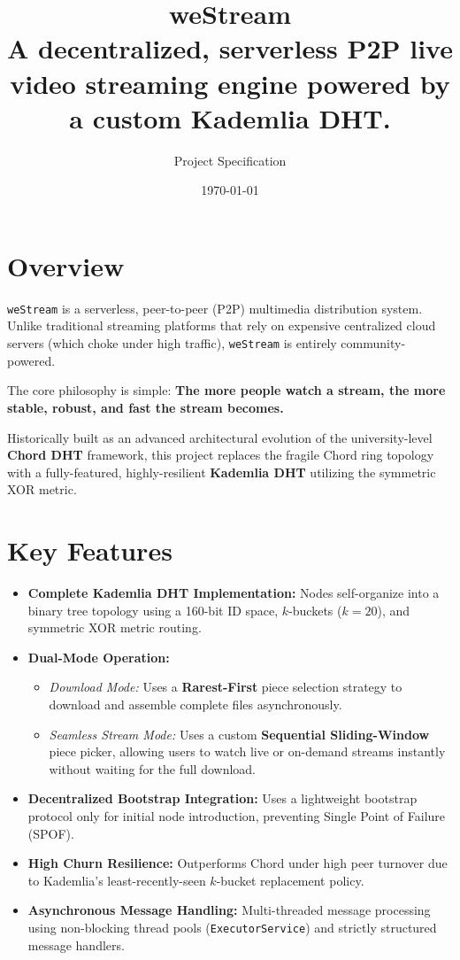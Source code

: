 \documentclass[11pt,a4paper]{article}
\title{\textbf{weStream}\\ \Large A decentralized, serverless P2P live video streaming engine powered by a custom Kademlia DHT.}
\author{Project Specification}
\date{\today}
\begin{document}
\maketitle

\section*{Overview}
\texttt{weStream} is a serverless, peer-to-peer (P2P) multimedia distribution system. Unlike traditional streaming platforms that rely on expensive centralized cloud servers (which choke under high traffic), \texttt{weStream} is entirely community-powered. 

The core philosophy is simple: \textbf{The more people watch a stream, the more stable, robust, and fast the stream becomes.}

Historically built as an advanced architectural evolution of the university-level \textbf{Chord DHT} framework, this project replaces the fragile Chord ring topology with a fully-featured, highly-resilient \textbf{Kademlia DHT} utilizing the symmetric XOR metric.

\section*{Key Features}
\begin{itemize}
    \item \textbf{Complete Kademlia DHT Implementation:} Nodes self-organize into a binary tree topology using a 160-bit ID space, $k$-buckets ($k=20$), and symmetric XOR metric routing.
    \item \textbf{Dual-Mode Operation:} 
    \begin{itemize}
        \item \textit{Download Mode:} Uses a \textbf{Rarest-First} piece selection strategy to download and assemble complete files asynchronously.
        \item \textit{Seamless Stream Mode:} Uses a custom \textbf{Sequential Sliding-Window} piece picker, allowing users to watch live or on-demand streams instantly without waiting for the full download.
    \end{itemize}
    \item \textbf{Decentralized Bootstrap Integration:} Uses a lightweight bootstrap protocol only for initial node introduction, preventing Single Point of Failure (SPOF).
    \item \textbf{High Churn Resilience:} Outperforms Chord under high peer turnover due to Kademlia's least-recently-seen $k$-bucket replacement policy.
    \item \textbf{Asynchronous Message Handling:} Multi-threaded message processing using non-blocking thread pools (\texttt{ExecutorService}) and strictly structured message handlers.
\end{itemize}
\end{document}
